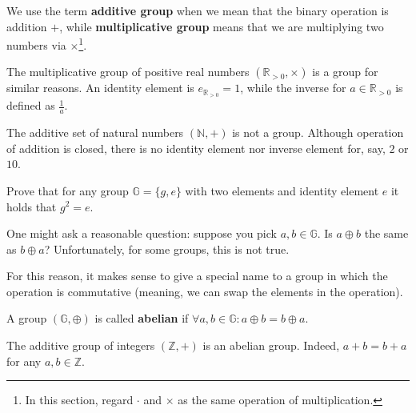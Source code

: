 \documentclass[../lecture-notes-148x210.tex]{subfiles}
\begin{document}
\begin{remark}
    We use the term \textbf{additive group} when we mean that the binary operation is addition $+$, while \textbf{multiplicative group} means that we are multiplying two numbers via $\times$\footnote{In this section, regard $\cdot$ and $\times$ as the same operation of multiplication.}.
\end{remark}

\begin{example}
    The multiplicative group of positive real numbers $(\mathbb{R}_{> 0}, \times)$ is a group for similar reasons. An identity element is $e_{\mathbb{R}_{>0}} = 1$, while the inverse for $a \in \mathbb{R}_{>0}$ is defined as $\frac{1}{a}$.
\end{example}

\begin{example}
    The additive set of natural numbers $(\mathbb{N}, +)$ is not a group. Although operation of addition is closed, there is no identity element nor inverse element for, say, $2$ or $10$.
\end{example}

\begin{exercise}
    Prove that for any group $\mathbb{G} = \{g, e\}$ with two elements and
    identity element $e$ it holds that $g^2 = e$.
\end{exercise}

One might ask a reasonable question: suppose you pick $a,b \in \mathbb{G}$. Is $a \oplus b$ the same as $b \oplus a$? Unfortunately, for some groups, this is not true. 

For this reason, it makes sense to give a special name to a group in which the operation is commutative (meaning, we can swap the elements in the operation).

\begin{definition}
    A group $(\mathbb{G},\oplus)$ is called \textbf{abelian} if $\forall a,b \in \mathbb{G}: a \oplus b = b \oplus a$.
\end{definition}

\begin{example}
    The additive group of integers $(\mathbb{Z},+)$ is an abelian group. Indeed, $a + b = b + a$ for any $a,b \in \mathbb{Z}$.
\end{example}
\end{document}
